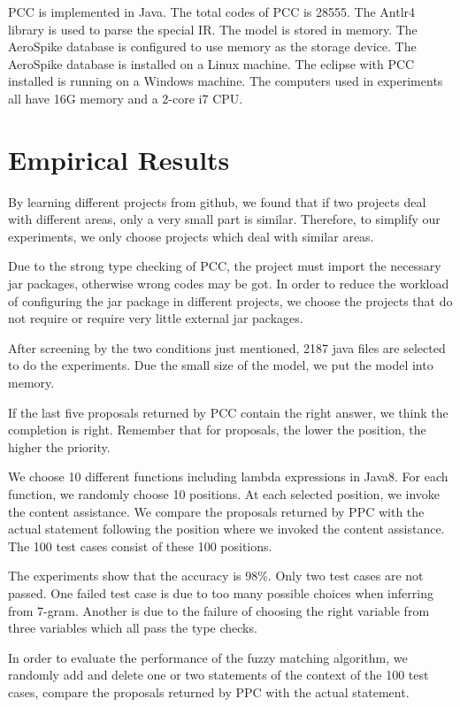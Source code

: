 \documentclass{sig-alternate-05-2015}
\begin{document}
PCC is implemented in Java. The total codes of PCC is 28555. The Antlr4\cite{antlr4} library is used to parse the special IR. The model is stored in memory. The AeroSpike database is configured to use memory as the storage device. The AeroSpike database is installed on a Linux machine. The eclipse with PCC installed is running on a Windows machine. The computers used in experiments all have 16G memory and a 2-core i7 CPU.

\section{Empirical Results}

By learning different projects from github, we found that if two projects deal with different areas, only a very small part is similar. Therefore, to simplify our experiments, we only choose projects which deal with similar areas.

Due to the strong type checking of PCC, the project must import the necessary jar packages, otherwise wrong codes may be got. In order to reduce the workload of configuring the jar package in different projects, we choose the projects that do not require or require very little external jar packages.

After screening by the two conditions just mentioned, 2187 java files are selected to do the experiments. Due the small size of the model, we put the model into memory.

If the last five proposals returned by PCC contain the right answer, we think the completion is right. Remember that for proposals, the lower the position, the higher the priority.

We choose 10 different functions including lambda expressions in Java8. For each function, we randomly choose 10 positions. At each selected position, we invoke the content assistance. We compare the proposals returned by PPC with the actual statement following the position where we invoked the content assistance. The 100 test cases consist of these 100 positions.

The experiments show that the accuracy is 98\%. Only two test cases are not passed. One failed test case is due to too many possible choices when inferring from 7-gram. Another is due to the failure of choosing the right variable from three variables which all pass the type checks.

In order to evaluate the performance of the fuzzy matching algorithm, we randomly add and delete one or two statements of the context of the 100 test cases, compare the proposals returned by PPC with the actual statement.
\end{document}
